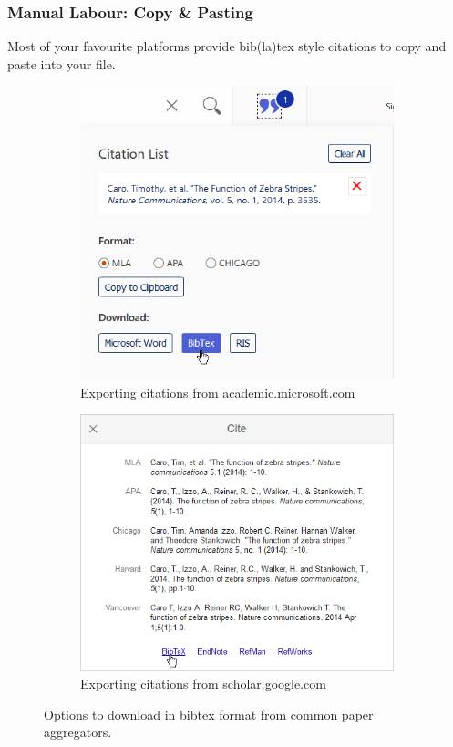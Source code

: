\documentclass[12pt]{scrarticle}
\begin{document}
\subsubsection{Manual Labour: Copy \& Pasting}
Most of your favourite platforms provide bib(la)tex style citations to copy and paste into your file.
\begin{figure}[H]
    \centering
    \begin{subfigure}{0.49\textwidth}
        \includegraphics[width=0.9\linewidth]{academic_microsoft.png}
        \caption{Exporting citations from \url{academic.microsoft.com}}
    \end{subfigure}
    \begin{subfigure}{0.49\textwidth}
        \includegraphics[width=0.9\linewidth]{scholar_google.png}
        \caption{Exporting citations from \url{scholar.google.com}}
    \end{subfigure}
    \caption{Options to download in bibtex format from common paper aggregators.}
    \label{fig:citations}
\end{figure}
\end{document}
